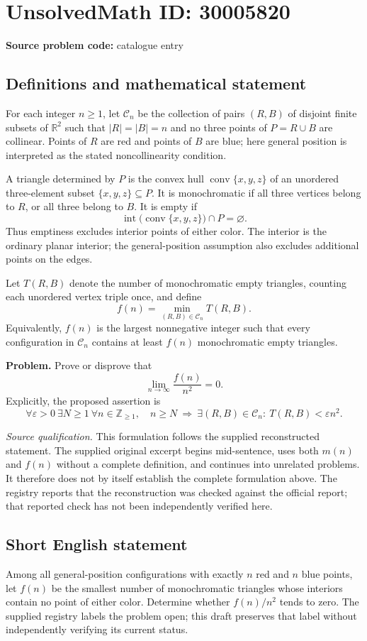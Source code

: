 \documentclass[11pt]{article}
\newcommand{\Z}{\mathbb{Z}}
\newcommand{\R}{\mathbb{R}}
\begin{document}
\section*{UnsolvedMath ID: 30005820}
\textbf{Source problem code:} catalogue entry
\subsection{Definitions and mathematical statement}
For each integer \(n\geq 1\), let \(\mathcal C_n\) be the collection of pairs \((R,B)\) of disjoint finite subsets of \(\R^2\) such that \(|R|=|B|=n\) and no three points of \(P=R\cup B\) are collinear. Points of \(R\) are red and points of \(B\) are blue; here general position is interpreted as the stated noncollinearity condition.

A triangle determined by \(P\) is the convex hull \(\operatorname{conv}\{x,y,z\}\) of an unordered three-element subset \(\{x,y,z\}\subseteq P\). It is monochromatic if all three vertices belong to \(R\), or all three belong to \(B\). It is empty if
\[
\operatorname{int}\bigl(\operatorname{conv}\{x,y,z\}\bigr)\cap P=\varnothing.
\]
Thus emptiness excludes interior points of either color. The interior is the ordinary planar interior; the general-position assumption also excludes additional points on the edges.

Let \(T(R,B)\) denote the number of monochromatic empty triangles, counting each unordered vertex triple once, and define
\[
f(n)=\min_{(R,B)\in\mathcal C_n}T(R,B).
\]
Equivalently, \(f(n)\) is the largest nonnegative integer such that every configuration in \(\mathcal C_n\) contains at least \(f(n)\) monochromatic empty triangles.

\textbf{Problem.} Prove or disprove that
\[
\lim_{n\to\infty}\frac{f(n)}{n^2}=0.
\]
Explicitly, the proposed assertion is
\[
\forall\varepsilon>0\ \exists N\geq1\ \forall n\in\Z_{\geq1},\quad
n\geq N\ \Longrightarrow\ \exists(R,B)\in\mathcal C_n:\ T(R,B)<\varepsilon n^2.
\]

\textit{Source qualification.} This formulation follows the supplied reconstructed statement. The supplied original excerpt begins mid-sentence, uses both \(m(n)\) and \(f(n)\) without a complete definition, and continues into unrelated problems. It therefore does not by itself establish the complete formulation above. The registry reports that the reconstruction was checked against the official report; that reported check has not been independently verified here.
\subsection{Short English statement}
Among all general-position configurations with exactly \(n\) red and \(n\) blue points, let \(f(n)\) be the smallest number of monochromatic triangles whose interiors contain no point of either color. Determine whether \(f(n)/n^2\) tends to zero. The supplied registry labels the problem open; this draft preserves that label without independently verifying its current status.
\end{document}
